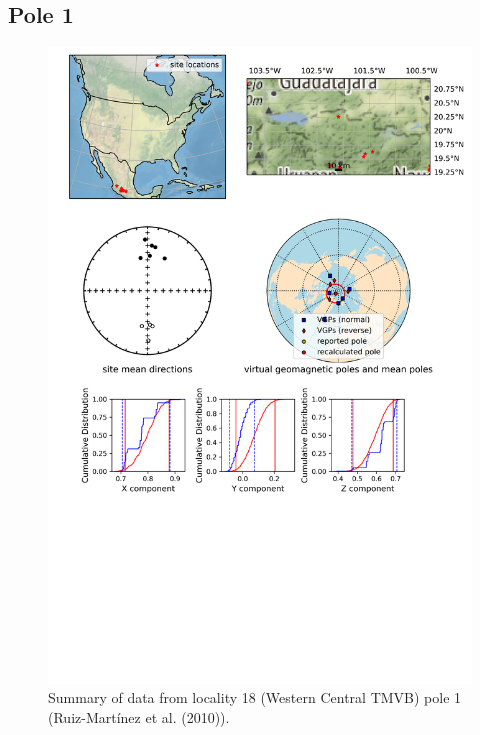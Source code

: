 \documentclass{article}
\begin{document}
\subsection{Pole 1}


\begin{figure}[H]
\centering
\includegraphics[width=5 in]{./18/1/pole_summary.png}
\caption{Summary of data from locality 18 (Western Central TMVB) pole 1 (Ruiz-Martínez et al. (2010)).}
\end{figure}
\end{document}
